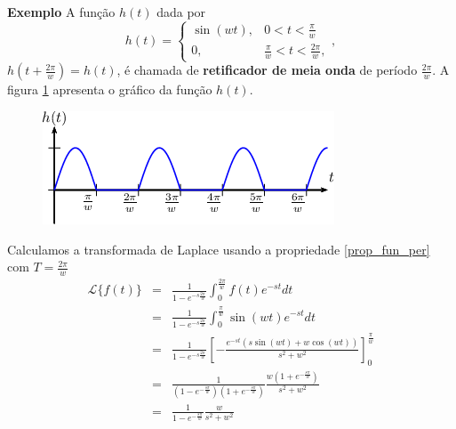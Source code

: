 \documentclass[a4paper,10pt]{book}
\begin{document}
{\bf Exemplo} A função $h(t)$ dada por
\begin{equation}
h(t)=\left\{\begin{array}{ll}\sin(wt),&0<t<\frac{\pi}{w}\\0,& \frac{\pi}{w}<t<\frac{2\pi}{w}, \end{array}\right.,
\end{equation}
$h\left(t+\frac{2\pi}{w}\right)=h(t)$, é chamada de {\bf retificador de meia onda} de período $\frac{2\pi}{w}$. A figura \ref{fig_ret_meia_onda} apresenta o gráfico da função $h(t)$.
  \begin{figure}[!ht]
 \begin{center}
  \includegraphics{figs/especiais_figura_3}
  \end{center}
  \caption{\label{fig_ret_meia_onda}}
 \end{figure}

Calculamos a transformada de Laplace usando a propriedade \ref{prop_fun_per} com $T=\frac{2\pi}{w}$
\begin{eqnarray*}
\mathcal{L}\{f(t)\}&=& \frac{1}{1-e^{-s\frac{2\pi}{w}}}\int_0^{\frac{2\pi}{w}}f(t)e^{-st}dt\\
&=& \frac{1}{1-e^{-s\frac{2\pi}{w}}} \int_0^{\frac{\pi}{w}}\sin(wt)e^{-st}dt\\
&=& \frac{1}{1-e^{-s\frac{2\pi}{w}}} \left[-\frac{e^{-st}\left(s\sin(wt)+w\cos(wt)\right)}{s^2+w^2}\right]_0^{\frac{\pi}{w}}\\
&=& \frac{1}{(1-e^{-\frac{s\pi}{w}})(1+e^{-\frac{s\pi}{w}})} \frac{w(1+e^{-\frac{s\pi}{w}})}{s^2+w^2}\\
&=& \frac{1}{1-e^{-\frac{s\pi}{w}}} \frac{w}{s^2+w^2}
\end{eqnarray*}
\end{document}
